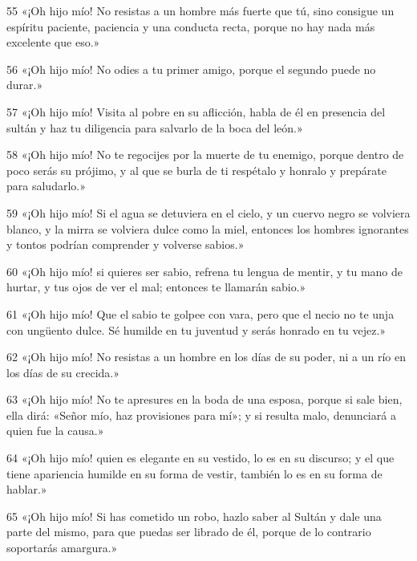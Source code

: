 \par 55 «¡Oh hijo mío! No resistas a un hombre más fuerte que tú, sino consigue un espíritu paciente, paciencia y una conducta recta, porque no hay nada más excelente que eso.»

\par 56 «¡Oh hijo mío! No odies a tu primer amigo, porque el segundo puede no durar.»

\par 57 «¡Oh hijo mío! Visita al pobre en su aflicción, habla de él en presencia del sultán y haz tu diligencia para salvarlo de la boca del león.»

\par 58 «¡Oh hijo mío! No te regocijes por la muerte de tu enemigo, porque dentro de poco serás su prójimo, y al que se burla de ti respétalo y honralo y prepárate para saludarlo.»

\par 59 «¡Oh hijo mío! Si el agua se detuviera en el cielo, y un cuervo negro se volviera blanco, y la mirra se volviera dulce como la miel, entonces los hombres ignorantes y tontos podrían comprender y volverse sabios.»

\par 60 «¡Oh hijo mío! si quieres ser sabio, refrena tu lengua de mentir, y tu mano de hurtar, y tus ojos de ver el mal; entonces te llamarán sabio.»

\par 61 «¡Oh hijo mío! Que el sabio te golpee con vara, pero que el necio no te unja con ungüento dulce. Sé humilde en tu juventud y serás honrado en tu vejez.»

\par 62 «¡Oh hijo mío! No resistas a un hombre en los días de su poder, ni a un río en los días de su crecida.»

\par 63 «¡Oh hijo mío! No te apresures en la boda de una esposa, porque si sale bien, ella dirá: «Señor mío, haz provisiones para mí»; y si resulta malo, denunciará a quien fue la causa.»

\par 64 «¡Oh hijo mío! quien es elegante en su vestido, lo es en su discurso; y el que tiene apariencia humilde en su forma de vestir, también lo es en su forma de hablar.»

\par 65 «¡Oh hijo mío! Si has cometido un robo, hazlo saber al Sultán y dale una parte del mismo, para que puedas ser librado de él, porque de lo contrario soportarás amargura.»

